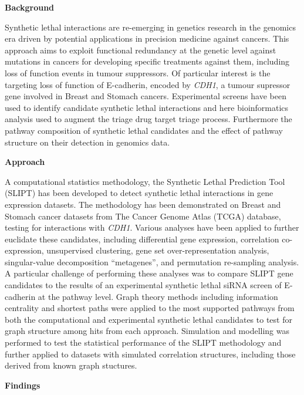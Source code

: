 \textbf{Background}

Synthetic lethal interactions are re-emerging in genetics research in the genomics era driven by potential applications in precision medicine against cancers. This approach aims to exploit functional redundancy at the genetic level against mutations in cancers for developing specific treatments against them, including loss of function events in tumour suppressors. Of particular interest is the targeting loss of function of E-cadherin, encoded by \textit{CDH1}, a tumour supressor gene involved in Breast and Stomach cancers. Experimental screens have been used to identify candidate synthetic lethal interactions and here bioinformatics analysis used to augment the triage drug target triage process. Furthermore the pathway composition of synthetic lethal candidates and the effect of pathway structure on their detection in genomics data. 

\textbf{Approach}

A computational statistics methodology, the Synthetic Lethal Prediction Tool (SLIPT) has been developed to detect synthetic lethal interactions in gene expression datasets. The methodology has been demonstrated on Breast and Stomach cancer datasets from The Cancer Genome Atlas (TCGA) database, testing for interactions with \textit{CDH1}. Various analyses have been applied to further euclidate these candidates, including differential gene expression, correlation co-expression, unsupervised clustering, gene set over-representation analysis, singular-value decomposition ``metagenes'', and permutation re-sampling analysis. A particular challenge of performing these analyses was to compare SLIPT gene candidates to the results of an experimental synthetic lethal siRNA screen of E-cadherin \citet{Telford2015} at the pathway level. Graph theory methods including information centrality and shortest paths were applied to the most supported pathways from both the computational and experimental synthetic lethal candidates to test for graph structure among hits from each approach. Simulation and modelling was performed to test the statistical performance of the SLIPT methodology and further applied to datasets with simulated correlation structures, including those derived from known graph stuctures.

\textbf{Findings}

